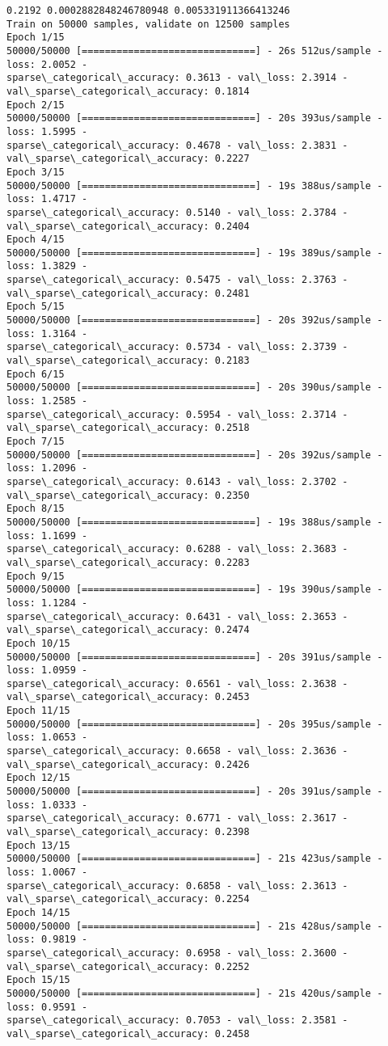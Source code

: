 \documentclass[11pt]{article}
\begin{document}
    \begin{Verbatim}[commandchars=\\\{\}]
0.2192 0.0002882848246780948 0.005331911366413246
Train on 50000 samples, validate on 12500 samples
Epoch 1/15
50000/50000 [==============================] - 26s 512us/sample - loss: 2.0052 -
sparse\_categorical\_accuracy: 0.3613 - val\_loss: 2.3914 -
val\_sparse\_categorical\_accuracy: 0.1814
Epoch 2/15
50000/50000 [==============================] - 20s 393us/sample - loss: 1.5995 -
sparse\_categorical\_accuracy: 0.4678 - val\_loss: 2.3831 -
val\_sparse\_categorical\_accuracy: 0.2227
Epoch 3/15
50000/50000 [==============================] - 19s 388us/sample - loss: 1.4717 -
sparse\_categorical\_accuracy: 0.5140 - val\_loss: 2.3784 -
val\_sparse\_categorical\_accuracy: 0.2404
Epoch 4/15
50000/50000 [==============================] - 19s 389us/sample - loss: 1.3829 -
sparse\_categorical\_accuracy: 0.5475 - val\_loss: 2.3763 -
val\_sparse\_categorical\_accuracy: 0.2481
Epoch 5/15
50000/50000 [==============================] - 20s 392us/sample - loss: 1.3164 -
sparse\_categorical\_accuracy: 0.5734 - val\_loss: 2.3739 -
val\_sparse\_categorical\_accuracy: 0.2183
Epoch 6/15
50000/50000 [==============================] - 20s 390us/sample - loss: 1.2585 -
sparse\_categorical\_accuracy: 0.5954 - val\_loss: 2.3714 -
val\_sparse\_categorical\_accuracy: 0.2518
Epoch 7/15
50000/50000 [==============================] - 20s 392us/sample - loss: 1.2096 -
sparse\_categorical\_accuracy: 0.6143 - val\_loss: 2.3702 -
val\_sparse\_categorical\_accuracy: 0.2350
Epoch 8/15
50000/50000 [==============================] - 19s 388us/sample - loss: 1.1699 -
sparse\_categorical\_accuracy: 0.6288 - val\_loss: 2.3683 -
val\_sparse\_categorical\_accuracy: 0.2283
Epoch 9/15
50000/50000 [==============================] - 19s 390us/sample - loss: 1.1284 -
sparse\_categorical\_accuracy: 0.6431 - val\_loss: 2.3653 -
val\_sparse\_categorical\_accuracy: 0.2474
Epoch 10/15
50000/50000 [==============================] - 20s 391us/sample - loss: 1.0959 -
sparse\_categorical\_accuracy: 0.6561 - val\_loss: 2.3638 -
val\_sparse\_categorical\_accuracy: 0.2453
Epoch 11/15
50000/50000 [==============================] - 20s 395us/sample - loss: 1.0653 -
sparse\_categorical\_accuracy: 0.6658 - val\_loss: 2.3636 -
val\_sparse\_categorical\_accuracy: 0.2426
Epoch 12/15
50000/50000 [==============================] - 20s 391us/sample - loss: 1.0333 -
sparse\_categorical\_accuracy: 0.6771 - val\_loss: 2.3617 -
val\_sparse\_categorical\_accuracy: 0.2398
Epoch 13/15
50000/50000 [==============================] - 21s 423us/sample - loss: 1.0067 -
sparse\_categorical\_accuracy: 0.6858 - val\_loss: 2.3613 -
val\_sparse\_categorical\_accuracy: 0.2254
Epoch 14/15
50000/50000 [==============================] - 21s 428us/sample - loss: 0.9819 -
sparse\_categorical\_accuracy: 0.6958 - val\_loss: 2.3600 -
val\_sparse\_categorical\_accuracy: 0.2252
Epoch 15/15
50000/50000 [==============================] - 21s 420us/sample - loss: 0.9591 -
sparse\_categorical\_accuracy: 0.7053 - val\_loss: 2.3581 -
val\_sparse\_categorical\_accuracy: 0.2458
    \end{Verbatim}
\end{document}
